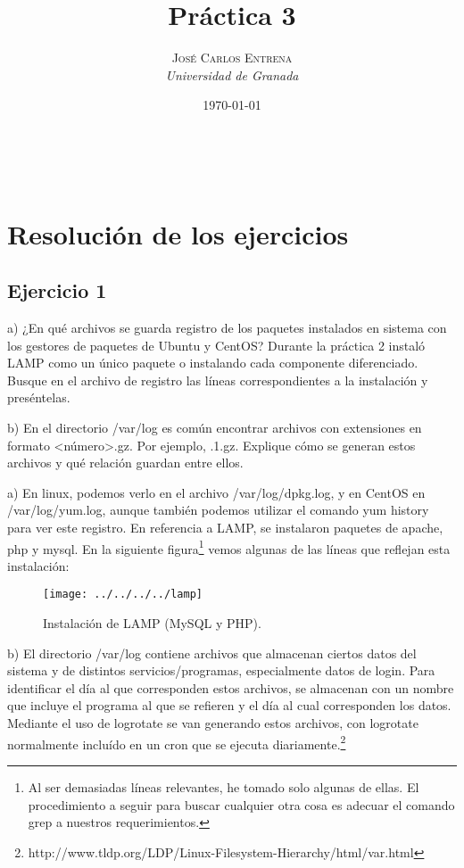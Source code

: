 \documentclass[a4paper, 11pt]{article} %
\title{\textbf{Práctica 3}\\ %
} %
\author{\textsc{José Carlos Entrena} %
\\{\textit{Universidad de Granada}}} %
\date{\today} %
\makeatletter
\renewcommand{\maketitle}{ %
\begin{flushright} %
{\LARGE\@title} %

\vspace{60pt} %

{\large\@author} %
\\\@date %

\vspace{40pt} %
\end{flushright}
}
\makeatother
\begin{document}
\maketitle %

{\parskip=2pt
  \tableofcontents
}   %

\pagebreak %

\section{Resolución de los ejercicios}

\subsection{Ejercicio 1}
a) ¿En qué archivos se guarda registro de los paquetes instalados en sistema con los gestores de paquetes de Ubuntu y CentOS? Durante la práctica 2 instaló LAMP como un único paquete o instalando cada componente diferenciado. Busque en el archivo de registro las líneas correspondientes a la instalación y preséntelas. 

b) En el directorio /var/log es común encontrar archivos con extensiones en formato <número>.gz. Por ejemplo, .1.gz. Explique cómo se generan estos archivos y qué relación guardan entre ellos. 


a) En linux, podemos verlo en el archivo /var/log/dpkg.log, y en CentOS en /var/log/yum.log, aunque también podemos utilizar el comando yum history para ver este registro. 
En referencia a LAMP, se instalaron paquetes de apache, php y mysql. En la siguiente figura\footnote{Al ser demasiadas líneas relevantes, he tomado solo algunas de ellas. El procedimiento a seguir para buscar cualquier otra cosa es adecuar el comando grep a nuestros requerimientos.} vemos algunas de las líneas que reflejan esta instalación: 

\begin{figure}[htpb]
\centering
\texttt{[image: ../../../../lamp]}
\caption{Instalación de LAMP (MySQL y PHP).}
\end{figure}

b) El directorio /var/log contiene archivos que almacenan ciertos datos del sistema y de distintos servicios/programas, especialmente datos de login. Para identificar el día al que corresponden estos archivos, se almacenan con un nombre que incluye el programa al que se refieren y el día al cual corresponden los datos. Mediante el uso de logrotate se van generando estos archivos, con logrotate normalmente incluído en un cron que se ejecuta diariamente.\footnote{http://www.tldp.org/LDP/Linux-Filesystem-Hierarchy/html/var.html}
\end{document}
